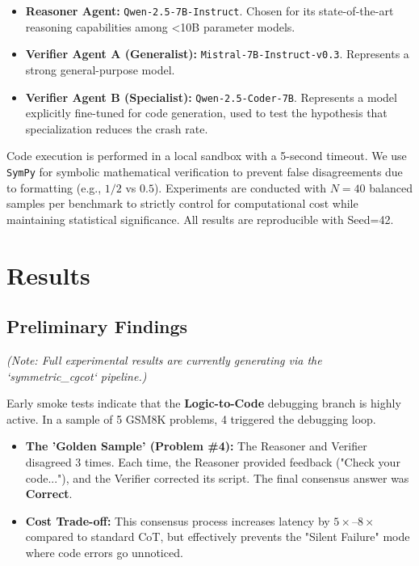\documentclass[11pt]{article}
\begin{document}
\begin{itemize}
\begin{itemize}
    \item \textbf{Reasoner Agent:} \texttt{Qwen-2.5-7B-Instruct}. Chosen for its state-of-the-art reasoning capabilities among <10B parameter models.
    \item \textbf{Verifier Agent A (Generalist):} \texttt{Mistral-7B-Instruct-v0.3}. Represents a strong general-purpose model.
    \item \textbf{Verifier Agent B (Specialist):} \texttt{Qwen-2.5-Coder-7B}. Represents a model explicitly fine-tuned for code generation, used to test the hypothesis that specialization reduces the crash rate.
\end{itemize}
Code execution is performed in a local sandbox with a 5-second timeout. We use \texttt{SymPy} for symbolic mathematical verification to prevent false disagreements due to formatting (e.g., $1/2$ vs $0.5$).
Experiments are conducted with $N=40$ balanced samples per benchmark to strictly control for computational cost while maintaining statistical significance. All results are reproducible with Seed=42.

\section{Results}
\label{sec:results}

\subsection{Preliminary Findings}
\emph{(Note: Full experimental results are currently generating via the `symmetric_cgcot` pipeline.)}

Early smoke tests indicate that the \textbf{Logic-to-Code} debugging branch is highly active. In a sample of 5 GSM8K problems, 4 triggered the debugging loop.
\begin{itemize}
    \item \textbf{The 'Golden Sample' (Problem \#4):} The Reasoner and Verifier disagreed 3 times. Each time, the Reasoner provided feedback ("Check your code..."), and the Verifier corrected its script. The final consensus answer was \textbf{Correct}.
    \item \textbf{Cost Trade-off:} This consensus process increases latency by $5\times$--$8\times$ compared to standard CoT, but effectively prevents the "Silent Failure" mode where code errors go unnoticed.
\end{itemize}


\end{itemize}
\end{document}
